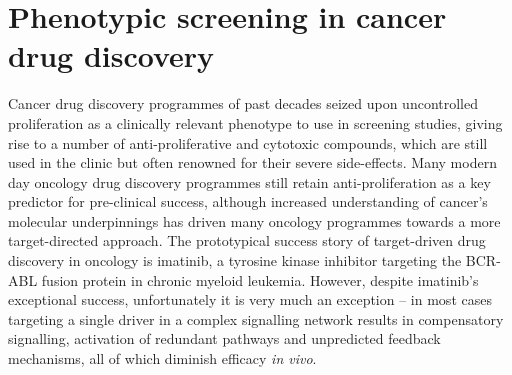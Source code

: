 \documentclass[a4paper,11pt,twoside,openright]{scrbook}
\begin{document}



\section{Phenotypic screening in cancer drug discovery}
Cancer drug discovery programmes of past decades seized upon uncontrolled proliferation as a clinically relevant phenotype to use in screening studies, giving rise to a number of anti-proliferative and cytotoxic compounds, which are still used in the clinic but often renowned for their severe side-effects.
Many modern day oncology drug discovery programmes still retain anti-proliferation as a key predictor for pre-clinical success, although increased understanding of cancer's molecular underpinnings has driven many oncology programmes towards a more target-directed approach.
The prototypical success story of target-driven drug discovery in oncology is imatinib, a tyrosine kinase inhibitor targeting the BCR-ABL fusion protein in chronic myeloid leukemia.
However, despite imatinib's exceptional success, unfortunately it is very much an exception -- in most cases targeting a single driver in a complex signalling network results in compensatory signalling, activation of redundant pathways and unpredicted feedback mechanisms, all of which diminish efficacy \textit{in vivo}.
\end{document}
